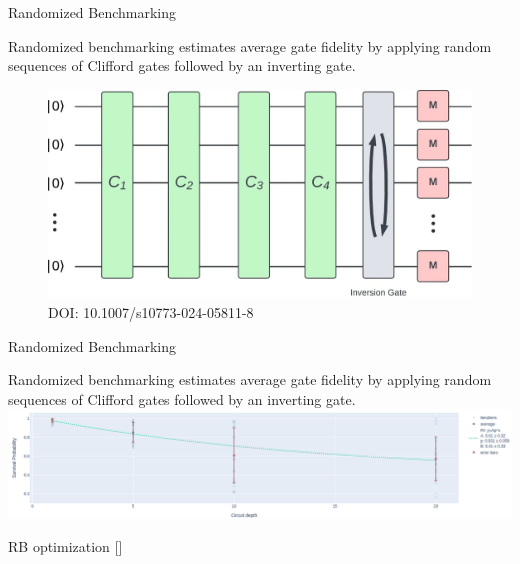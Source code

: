 \documentclass[aspectratio=169,10pt]{beamer}
\begin{document}
\begin{frame}[t,fragile]{Randomized Benchmarking}
\begin{center}
  Randomized benchmarking estimates average gate fidelity by applying random sequences of Clifford gates followed by an inverting gate.
  \vspace{3mm}
  \begin{figure}
      \includegraphics[height=0.52\textheight]{figures/RBcircuit.png}
      \caption{DOI: 10.1007/s10773-024-05811-8}
  \end{figure}
\end{center}
\end{frame}

\begin{frame}[t,fragile]{Randomized Benchmarking}
\begin{center}
  Randomized benchmarking estimates average gate fidelity by applying random sequences of Clifford gates followed by an inverting gate.
  \vfill
  \includegraphics[width=\textwidth]{figures/rb.png}
\end{center}
\end{frame}

\begin{frame}[t,fragile]{RB optimization [\cite{kelly_optimal_2014}]}%
\end{frame}
\end{document}
